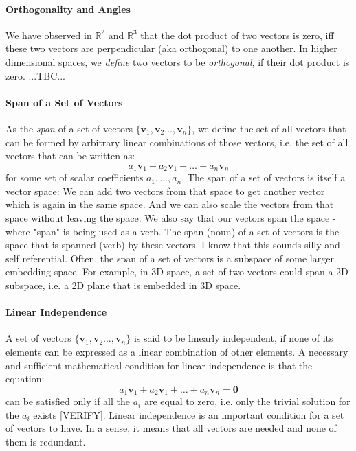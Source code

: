 \paragraph{Orthogonality and Angles}
We have observed in $\mathbb{R}^2$ and $\mathbb{R}^3$ that the dot product of two vectors is zero, iff these two vectors are perpendicular (aka orthogonal) to one another. In higher dimensional spaces, we \emph{define} two vectors to be \emph{orthogonal}, if their dot product is zero. ...TBC...

% 



\paragraph{Span of a Set of Vectors}
As the \emph{span} of a set of vectors $\{\mathbf{v}_1, \mathbf{v}_2 \ldots, \mathbf{v}_n \}$, we define the set of all vectors that can be formed by arbitrary linear combinations of those vectors, i.e. the set of all vectors that can be written as:
\begin{equation}
 a_1 \mathbf{v}_1 + a_2 \mathbf{v}_1  + \ldots + a_n \mathbf{v}_n 
\end{equation}
for some set of scalar coefficients $a_1, \ldots, a_n$. The span of a set of vectors is itself a vector space: We can add two vectors from that space to get another vector which is again in the same space. And we can also scale the vectors from that space without leaving the space. We also say that our vectors span the space - where "span" is being used as a verb. The span (noun) of a set of vectors is the space that is spanned (verb) by these vectors. I know that this sounds silly and self referential. Often, the span of a set of vectors is a subspace of some larger embedding space. For example, in 3D space, a set of two vectors could span a 2D subspace, i.e. a 2D plane that is embedded in 3D space.


\paragraph{Linear Independence}
A set of vectors $\{\mathbf{v}_1, \mathbf{v}_2 \ldots, \mathbf{v}_n \}$ is said to be linearly independent, if none of its elements can be expressed as a linear combination of other elements. A necessary and sufficient mathematical condition for linear independence is that the equation:
\begin{equation}
 a_1 \mathbf{v}_1 + a_2 \mathbf{v}_1  + \ldots + a_n \mathbf{v}_n = \mathbf{0}
\end{equation}
can be satisfied only if all the $a_i$ are equal to zero, i.e. only the trivial solution for the $a_i$ exists [VERIFY]. Linear independence is an important condition for a set of vectors to have. In a sense, it means that all vectors are needed and none of them is redundant. 

